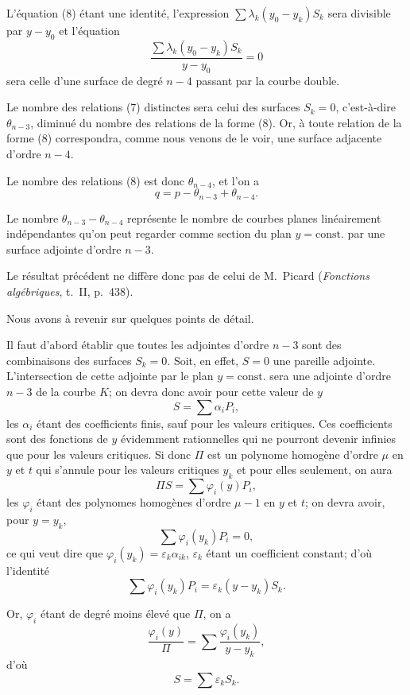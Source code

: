\documentclass{article}
\begin{document}
L'équation (8) étant une identité, l'expression $\displaystyle\sum \lambda_{k}(y_{0} - y_{k})S_{k}$ sera divisible par $y - y_{0}$ et l'équation
\[
\frac{\sum \lambda_{k}(y_{0} - y_{k})S_{k}}{y - y_{0}} = 0 \tag{10}
\]
sera celle d'une surface de degré $n - 4$ passant par la courbe double.

Le nombre des relations (7) distinctes sera celui des surfaces $S_{k} = 0$, c'est-à-dire $\theta_{n-3}$, diminué du nombre des relations de la forme (8). Or, à toute relation de la forme (8) correspondra, comme nous venons de le voir, une surface adjacente d'ordre $n - 4$.

Le nombre des relations (8) est donc $\theta_{n-4}$, et l'on a
\[
q = p - \theta_{n-3} + \theta_{n-4}.
\]

Le nombre $\theta_{n-3} - \theta_{n-4}$ représente le nombre de courbes planes linéairement indépendantes qu'on peut regarder comme section du plan $y = \mathrm{const.}$ par une surface adjointe d'ordre $n - 3$.

Le résultat précédent ne diffère donc pas de celui de M.~Picard (\emph{Fonctions algébriques}, t.~II, p.~438).

Nous avons à revenir sur quelques points de détail.

Il faut d'abord établir que toutes les adjointes d'ordre $n - 3$ sont des combinaisons des surfaces $S_{k} = 0$. Soit, en effet, $S = 0$ une pareille adjointe. L'intersection de cette adjointe par le plan $y = \mathrm{const.}$ sera une adjointe d'ordre $n - 3$ de la courbe $K$; on devra donc avoir pour cette valeur de $y$
\[
S = \sum \alpha_{i} P_{i},
\]
les $\alpha_{i}$ étant des coefficients finis, sauf pour les valeurs critiques. Ces
coefficients sont des fonctions de $y$ évidemment rationnelles qui ne pourront devenir infinies que pour les valeurs critiques. Si donc $\Pi$ est un polynome homogène d'ordre $\mu$ en $y$ et $t$ qui s'annule pour les valeurs critiques $y_{k}$ et pour elles seulement, on aura
\[
\Pi S = \sum \varphi_{i}(y) P_{i},
\]
les $\varphi_{i}$ étant des polynomes homogènes d'ordre $\mu - 1$ en $y$ et $t$; on devra avoir, pour $y = y_{k}$,
\[
\sum \varphi_{i}(y_{k}) P_{i} = 0,
\]
ce qui veut dire que $\varphi_{i}(y_{k}) = \varepsilon_{k}\alpha_{ik}$, $\varepsilon_{k}$ étant un coefficient constant; d'où l'identité
\[
\sum \varphi_{i}(y_{k}) P_{i} = \varepsilon_{k}(y - y_{k}) S_{k}.
\]

Or, $\varphi_{i}$ étant de degré moins élevé que $\Pi$, on a
\[
\frac{\varphi_{i}(y)}{\Pi} = \sum \frac{\varphi_{i}(y_{k})}{y - y_{k}},
\]
d'où
\[
S = \sum \varepsilon_{k} S_{k}.
\]
\end{document}
